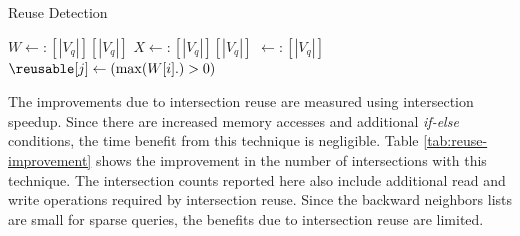 \begin{algorithm}
    \caption{Reuse Detection}
    \label{algo:reuse}
    $W \leftarrow: [|V_q|][|V_q|]$\;
    $X \leftarrow: [|V_q|][|V_q|]$\;
    \reusable $\leftarrow: [|V_q|]$\;
    $\reusable[j] \leftarrow (\max({W[i].)} > 0)$\;
\end{algorithm}

The improvements due to intersection reuse are measured using intersection speedup.
Since there are increased memory accesses and additional \textit{if-else} conditions, the time benefit from this technique is negligible. Table \ref{tab:reuse-improvement} shows the improvement in the number of intersections with this technique.
The intersection counts reported here also include additional read and write operations required by intersection reuse.
Since the backward neighbors lists are small for sparse queries, the benefits due to intersection reuse are limited.

